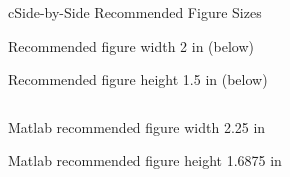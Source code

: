 \begin{myslide}{c}{Side-by-Side Recommended Figure Sizes}

Recommended figure width 2 in (below)

Recommended figure height 1.5 in (below)

\begin{columns}



\end{columns}

\vspace{\baselineskip}

Matlab recommended figure width 2.25 in

Matlab recommended figure height 1.6875 in

\end{myslide}
